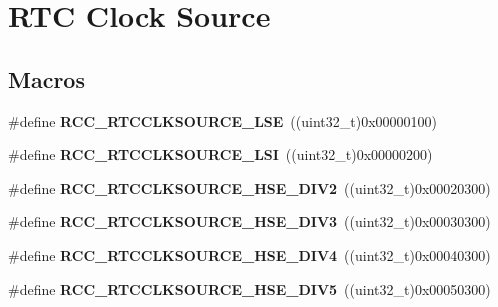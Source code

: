 \hypertarget{group___r_c_c___r_t_c___clock___source}{}\section{R\+TC Clock Source}
\label{group___r_c_c___r_t_c___clock___source}
\subsection*{Macros}
\begin{DoxyCompactItemize}
\item 
\#define {\bfseries R\+C\+C\+\_\+\+R\+T\+C\+C\+L\+K\+S\+O\+U\+R\+C\+E\+\_\+\+L\+SE}~((uint32\+\_\+t)0x00000100)\hypertarget{group___r_c_c___r_t_c___clock___source_ga5dca8d63f250a20bd6bc005670d0c150}{}\label{group___r_c_c___r_t_c___clock___source_ga5dca8d63f250a20bd6bc005670d0c150}

\item 
\#define {\bfseries R\+C\+C\+\_\+\+R\+T\+C\+C\+L\+K\+S\+O\+U\+R\+C\+E\+\_\+\+L\+SI}~((uint32\+\_\+t)0x00000200)\hypertarget{group___r_c_c___r_t_c___clock___source_gab47a1afb8b5eef9f20f4772961d0a5f4}{}\label{group___r_c_c___r_t_c___clock___source_gab47a1afb8b5eef9f20f4772961d0a5f4}

\item 
\#define {\bfseries R\+C\+C\+\_\+\+R\+T\+C\+C\+L\+K\+S\+O\+U\+R\+C\+E\+\_\+\+H\+S\+E\+\_\+\+D\+I\+V2}~((uint32\+\_\+t)0x00020300)\hypertarget{group___r_c_c___r_t_c___clock___source_gac1ee63256acb5637e994abf629edaf3b}{}\label{group___r_c_c___r_t_c___clock___source_gac1ee63256acb5637e994abf629edaf3b}

\item 
\#define {\bfseries R\+C\+C\+\_\+\+R\+T\+C\+C\+L\+K\+S\+O\+U\+R\+C\+E\+\_\+\+H\+S\+E\+\_\+\+D\+I\+V3}~((uint32\+\_\+t)0x00030300)\hypertarget{group___r_c_c___r_t_c___clock___source_ga242119dd2fc5e6ec6d7c2aa239dbcb9f}{}\label{group___r_c_c___r_t_c___clock___source_ga242119dd2fc5e6ec6d7c2aa239dbcb9f}

\item 
\#define {\bfseries R\+C\+C\+\_\+\+R\+T\+C\+C\+L\+K\+S\+O\+U\+R\+C\+E\+\_\+\+H\+S\+E\+\_\+\+D\+I\+V4}~((uint32\+\_\+t)0x00040300)\hypertarget{group___r_c_c___r_t_c___clock___source_ga0f45ba0fe6a8f125137d3cee8b49f7cc}{}\label{group___r_c_c___r_t_c___clock___source_ga0f45ba0fe6a8f125137d3cee8b49f7cc}

\item 
\#define {\bfseries R\+C\+C\+\_\+\+R\+T\+C\+C\+L\+K\+S\+O\+U\+R\+C\+E\+\_\+\+H\+S\+E\+\_\+\+D\+I\+V5}~((uint32\+\_\+t)0x00050300)\hypertarget{group___r_c_c___r_t_c___clock___source_ga229473454f04d994e1ed1751d6b19e48}{}\label{group___r_c_c___r_t_c___clock___source_ga229473454f04d994e1ed1751d6b19e48}


\end{DoxyCompactItemize}
